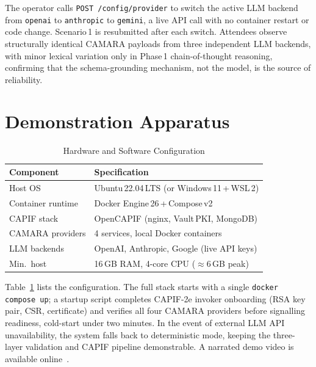 \documentclass[conference]{IEEEtran}
\begin{document}
The operator calls \texttt{POST\,/config/provider} to switch the
active LLM backend from \texttt{openai} to \texttt{anthropic} to
\texttt{gemini}, a live API call with no container restart or code
change.
Scenario\,1 is resubmitted after each switch.
Attendees observe structurally identical CAMARA payloads from three
independent LLM backends, with minor lexical variation only in
Phase\,1 chain-of-thought reasoning, confirming that the
schema-grounding mechanism, not the model, is the source of
reliability.


\section{Demonstration Apparatus}
\label{sec:apparatus}


\begin{table}[t]
\centering
\caption{Hardware and Software Configuration}
\label{tab:setup}
\small
\begin{tabular}{ll}
\toprule
\textbf{Component} & \textbf{Specification} \\
\midrule
Host OS            & Ubuntu\,22.04\,LTS (or Windows\,11\,+\,WSL\,2) \\
Container runtime  & Docker Engine\,26\,+\,Compose\,v2 \\
CAPIF stack        & OpenCAPIF (nginx, Vault\,PKI, MongoDB) \\
CAMARA providers   & 4 services, local Docker containers \\
LLM backends       & OpenAI, Anthropic, Google (live API keys) \\
Min.\ host         & 16\,GB RAM, 4-core CPU ($\approx$6\,GB peak) \\
\bottomrule
\end{tabular}
\end{table}

Table~\ref{tab:setup} lists the configuration.
The full stack starts with a single \texttt{docker compose up}; a
startup script completes CAPIF-2e invoker onboarding (RSA key pair,
CSR, certificate) and verifies all four CAMARA providers before
signalling readiness, cold-start under two minutes.
In the event of external LLM API unavailability, the system falls back
to deterministic mode, keeping the three-layer validation and CAPIF
pipeline demonstrable.
A narrated demo video is available online~\cite{demo_video2025}.
\end{document}
